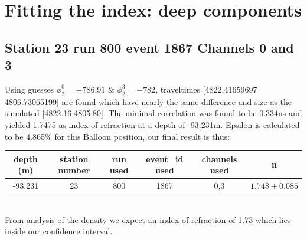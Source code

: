 \documentclass[11pt,a4paper,faculty=we,language=en,doctype=report]{cls/ugent-doc}
\begin{document}
\section{Fitting the index: deep components}

\subsection{Station 23 run 800 event 1867 Channels 0 and 3}
Using guesses $\phi_2^0 = -786.91$ \& $\phi_2^3 = -782$, traveltimes
[4822.41659697 4806.73065199] are found which have nearly the same difference
and size as the simulated [4822.16,4805.80]. The minimal correlation was found to be
$0.334$ns and yielded 1.7475 as index of refraction at a depth of -93.231m.
Epsilon is calculated to be 4.865\% for this Balloon position, our final result is 
thus:
\begin{table}[h]
    \centering
    \begin{tabular}{c|c|c|c|c|c}
      depth (m)& station number & run used & event\_id used & channels used & n\\
      \hline
      -93.231& 23 & 800 & 1867 & 0,3 & $1.748 \pm 0.085$
    \end{tabular}
\end{table}\\
From analysis of the density we expect an index of refraction of 1.73 which
lies inside our confidence interval.
\end{document}

